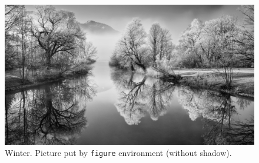 \documentclass[11pt,            %
               aspectratio=169, %
               xcolor=svgnames,
               t                %
               ]{beamer}
\begin{document}

\begin{frame}[plain]
\pause
\begin{figure}
\includegraphics[width=.8\linewidth]{whiteLandscape.jpg}
\pause
\caption{Winter. Picture put by \texttt{figure} environment (without shadow).}
\end{figure}
\end{frame}

\begin{frame}[plain]
\pause
{}
\end{frame}

\begin{frame}[plain]
\end{frame}
\end{document}
